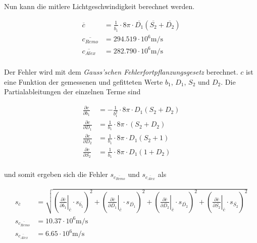 Nun kann die mitlere Lichtgeschwindigkeit berechnet  werden.

\begin{align*}
    \overline{c}            &= \frac{1}{\overline{b_1}} \cdot 8\pi \cdot \overline{D_1}(\overline{S_2} + \overline{D_2}) \\
    \overline{c_{Remo}}     &= 294.519 \cdot 10^{6} \textrm{m}/\textrm{s} \\
    \overline{c_{Alex}}     &= 282.790 \cdot 10^{6} \textrm{m}/\textrm{s} \\
\end{align*}

Der  Fehler  wird   mit   dem   \emph{Gauss'schen  Fehlerfortpflanzungsgesetz}
berechnet. $c$ ist eine Funktion der gemessenen  und  gefitteten  Werte $b_1$,
$D_1$,  $S_2$ und $D_2$.  Die  Partialableitungen  der  einzelnen  Terme  sind

\begin{align*}
    \frac{\partial c}{\partial b_1} &= -\frac{1}{b_1^2} \cdot 8\pi \cdot D_1(S_2 + D_2) \\
    \frac{\partial c}{\partial D_1} &= \frac{1}{b_1} \cdot 8\pi \cdot (S_2 + D_2) \\
    \frac{\partial c}{\partial D_2} &= \frac{1}{b_1} \cdot 8\pi \cdot D_1(S_2 + 1) \\
    \frac{\partial c}{\partial S_2} &= \frac{1}{b_1} \cdot 8\pi \cdot D_1(1 + D_2) \\
\end{align*}

und   somit    ergeben    sich    die   Fehler   $s_{\overline{c_{Remo}}}$   und
$s_{\overline{c_{Alex}}}$ als

\begin{align*}
    s_{\overline{c}} &= \sqrt{ \left( \left.\frac{\partial \overline{c}}{\partial \overline{b_1}} \right\rvert_{\overline{c}} \cdot s_{\overline{b_1}} \right)^2
                             + \left( \left.\frac{\partial \overline{c}}{\partial \overline{D_1}} \right\rvert_{\overline{c}} \cdot s_{\overline{D_1}} \right)^2
                             + \left( \left.\frac{\partial \overline{c}}{\partial \overline{D_2}} \right\rvert_{\overline{c}} \cdot s_{\overline{D_2}} \right)^2
                             + \left( \left.\frac{\partial \overline{c}}{\partial \overline{S_2}} \right\rvert_{\overline{c}} \cdot s_{\overline{S_2}} \right)^2 } \\
    s_{\overline{c_{Remo}}}     &= 10.37 \cdot 10^6 \textrm{m}/\textrm{s} \\
    s_{\overline{c_{Alex}}} &= 6.65 \cdot 10^6 \textrm{m}/\textrm{s} \\
\end{align*}

